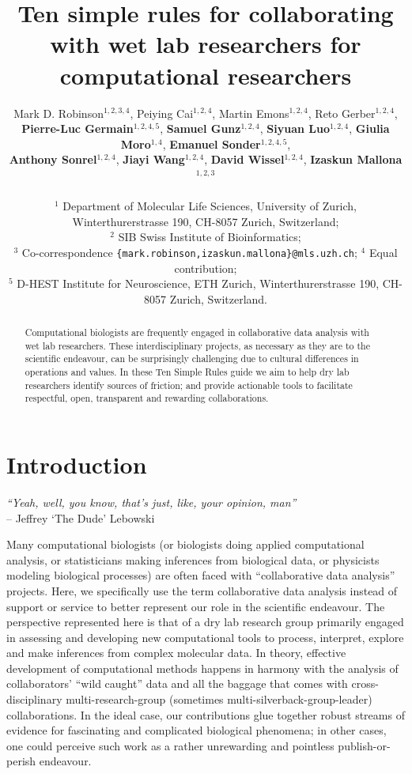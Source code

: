 \documentclass{article}
\title{Ten simple rules for collaborating with wet lab researchers for computational researchers}
\author{
Mark D. Robinson$^{1,2,3,4}$, 
Peiying Cai$^{1,2,4}$,
Martin Emons$^{1,2,4}$,
Reto Gerber$^{1,2,4}$,\\
\textbf{Pierre-Luc Germain$^{1,2,4,5}$},
\textbf{Samuel Gunz$^{1,2,4}$}, 
\textbf{Siyuan Luo$^{1,2,4}$},
\textbf{Giulia Moro$^{1,4}$},
\textbf{Emanuel Sonder$^{1,2,4,5}$},\\
\textbf{Anthony Sonrel$^{1,2,4}$},
\textbf{Jiayi Wang$^{1,2,4}$},
\textbf{David Wissel$^{1,2,4}$},
\textbf{Izaskun Mallona$^{1,2,3}$}\\ 
\\
$^1$ Department of Molecular Life Sciences, University of Zurich, Winterthurerstrasse 190, CH-8057 Zurich, Switzerland;\\ $^2$ SIB Swiss Institute of Bioinformatics;\\ $^3$ Co-correspondence \texttt{\{mark.robinson,izaskun.mallona\}@mls.uzh.ch}; $^4$ Equal contribution;\\
$^5$ D-HEST Institute for Neuroscience, ETH Zurich, Winterthurerstrasse 190, CH-8057 Zurich, Switzerland.\\ 
}
\begin{document}
\maketitle

\vspace{-0.5cm}

\begin{abstract}
Computational biologists are frequently engaged in collaborative data analysis with wet lab researchers. These interdisciplinary projects, as necessary as they are to the scientific endeavour, can be surprisingly challenging due to cultural differences in operations and values. In these Ten Simple Rules guide we aim to help dry lab researchers identify sources of friction; and provide actionable tools to facilitate respectful, open, transparent and rewarding collaborations.
\end{abstract}


\section*{Introduction} %

\begin{flushright}
\rightskip=1cm\textit{``Yeah, well, you know, that's just, like, your opinion, man''} \\
\vspace{.2em}
\rightskip=0cm -- Jeffrey `The Dude' Lebowski
\end{flushright}

Many computational biologists (or biologists doing applied computational analysis, or statisticians making inferences from biological data, or physicists modeling biological processes) are often faced with ``collaborative data analysis'' projects. Here, we specifically use the term collaborative data analysis instead of support or service to better represent our role in the scientific endeavour. The perspective represented here is that of a dry lab research group primarily engaged in assessing and developing new computational tools to process, interpret, explore and make inferences from complex molecular data. In theory, effective development of computational methods happens in harmony with the analysis of collaborators’ ``wild caught'' data and all the baggage that comes with cross-disciplinary multi-research-group (sometimes multi-silverback-group-leader) collaborations. In the ideal case, our contributions glue together robust streams of evidence for fascinating and complicated biological phenomena; in other cases, one could perceive such work as a rather unrewarding and pointless publish-or-perish endeavour.
\end{document}
